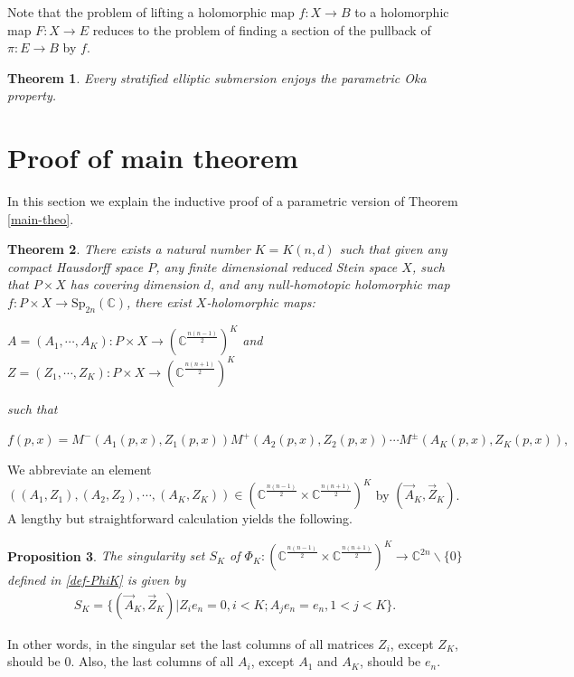 \documentclass[10pt]{amsart}
\newtheorem{theo}{Theorem}[section]
\newtheorem{prop}[theo]{Proposition}
\theoremstyle{remark}
\begin{document}
Note that the problem of lifting a holomorphic map $f : X \to B$ to a holomorphic map $F : X \to E$ reduces to the problem of finding a section of the pullback of $\pi: E \to B$ by $f$. 

\begin{theo} \label{POP}
    Every stratified elliptic submersion enjoys the parametric Oka property.
\end{theo} 

\section{Proof of main theorem}\label{3}
In this section we explain the inductive proof of a parametric version of Theorem \ref{main-theo}. 

\begin{theo}\label{main-theo-parametric} 
There exists a natural
number $K = K(n, d)$ such that given any compact Hausdorff space $P$, any finite dimensional reduced Stein space $X$, such that $P \times X$ has covering dimension $d$, and any null-homotopic holomorphic map $f : P \times X \to \mathrm{Sp}_{2n}(\mathbb{C})$, there exist $X$-holomorphic maps:
\begin{center}
$A = (A_1, \cdots, A_K) : P \times X \to (\mathbb{C}^{\frac{n(n-1)}{2}} )^K
$  and $Z = (Z_1, \cdots, Z_K) : P \times X \to (\mathbb{C}^{\frac{n(n+1)}{2}} )^K
$ 
\end{center}
such that
\begin{center}
 $f(p, x) = M^-(A_1(p,x), Z_1(p,x)) M^+(A_2(p,x), Z_2(p,x)) 
 \cdots M^{\pm}(A_K(p,x), Z_K(p,x)),$     
\end{center}
\end{theo}


We abbreviate an element $((A_1,Z_1),(A_2,Z_2),\cdots,(A_K,Z_K)) \in (\mathbb{C}^{\frac{n(n-1)}{2}} \times \mathbb{C}^{\frac{n(n+1)}{2}})^K$ by $(\Vec{A}_K,\Vec{Z}_K )$. %
A lengthy but straightforward calculation yields the following.

\begin{prop} \label{SingSet}
    The singularity set $S_K$ of $\Phi_K: (\mathbb{C}^{\frac{n(n-1)}{2}} \times \mathbb{C}^{\frac{n(n+1)}{2}})^K  \to \mathbb{C}^{2n}\backslash \lbrace 0 \rbrace$ defined in \eqref{def-PhiK} is given by
    \begin{align*}
        S_K = \lbrace (\Vec{A}_K,\Vec{Z}_K)|Z_{i} e_n = 0, i<K;  A_j e_n = e_n, 1 < j < K \rbrace.
    \end{align*}
\end{prop}
In other words, in the singular set the last columns of all matrices $Z_i$, except $Z_K$, should be 0. Also, the last columns of all $A_i$, except $A_1$ and $A_K$, should be $e_n$.
\end{document}
